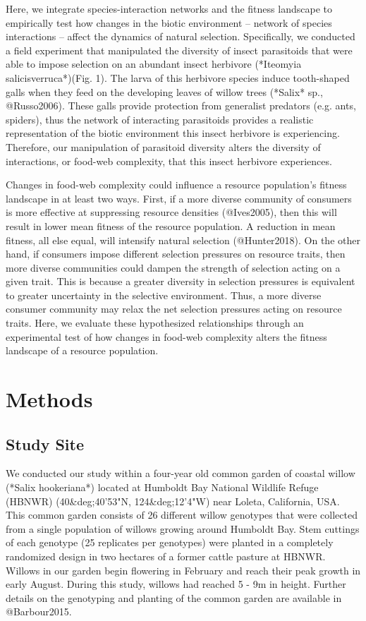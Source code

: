 \documentclass[11pt]{article}
\begin{document}
Here, we integrate species-interaction networks and the fitness landscape to empirically test how changes in the biotic environment -- network of species interactions -- affect the dynamics of natural selection. Specifically, we conducted a field experiment that manipulated the diversity of insect parasitoids that were able to impose selection on an abundant insect herbivore (*Iteomyia salicisverruca*)(Fig. 1). The larva of this herbivore species induce tooth-shaped galls when they feed on the developing leaves of willow trees (*Salix* sp., @Russo2006). These galls provide protection from generalist predators (e.g. ants, spiders), thus the network of interacting parasitoids provides a realistic representation of the biotic environment this insect herbivore is experiencing. Therefore, our manipulation of parasitoid diversity alters the diversity of interactions, or food-web complexity, that this insect herbivore experiences.

Changes in food-web complexity could influence a resource population's fitness landscape in at least two ways. First, if a more diverse community of consumers is more effective at suppressing resource densities (@Ives2005), then this will result in lower mean fitness of the resource population. A reduction in mean fitness, all else equal, will intensify natural selection (@Hunter2018). On the other hand, if consumers impose different selection pressures on resource traits, then more diverse communities could dampen the strength of selection acting on a given trait. This is because a greater diversity in selection pressures is equivalent to greater uncertainty in the selective environment. Thus, a more diverse consumer community may relax the net selection pressures acting on resource traits. Here, we evaluate these hypothesized relationships through an experimental test of how changes in food-web complexity alters the fitness landscape of a resource population.

\section*{Methods}

\subsection*{Study Site}

We conducted our study within a four-year old common garden of coastal willow (*Salix hookeriana*) located at Humboldt Bay National Wildlife Refuge (HBNWR) (40&deg;40'53"N, 124&deg;12'4"W) near Loleta, California, USA. This common garden consists of 26 different willow genotypes that were collected from a single population of willows growing around Humboldt Bay. Stem cuttings of each genotype (25 replicates per genotypes) were planted in a completely randomized design in two hectares of a former cattle pasture at HBNWR. Willows in our garden begin flowering in February and reach their peak growth in early August. During this study, willows had reached 5 - 9m in height. Further details on the genotyping and planting of the common garden are available in @Barbour2015.  
\end{document}
